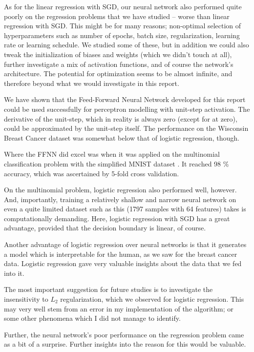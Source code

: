 \documentclass[]{article}
\begin{document}
As for the linear regression with SGD, our neural network also performed quite poorly on the regression problems that we have studied -- worse than linear regression with SGD. This might be for many reasons; non-optimal selection of hyperparameters such as number of epochs, batch size, regularization, learning rate or learning schedule. We studied some of these, but in addition we could also tweak the initialization of biases and weights (which we didn't touch at all), further investigate a mix of activation functions, and of course the network's architecture. The potential for optimization seems to be almost infinite, and therefore beyond what we would investigate in this report.

We have shown that the Feed-Forward Neural Network developed for this report could be used successfully for perceptron modelling with unit-step activation. The derivative of the unit-step, which in reality is always zero (except for at zero), could be approximated by the unit-step itself. The performance on the Wisconsin Breast Cancer dataset \cite{skl-datasets} was somewhat below that of logistic regression, though.

Where the FFNN did excel was when it was applied on the multinomial classification problem with the simplified MNIST dataset \cite{skl-datasets}. It reached 98 \% accuracy, which was ascertained by 5-fold cross validation.

On the multinomial problem, logistic regression also performed well, however. And, importantly, training a relatively shallow and narrow neural network on even a quite limited dataset such as this (1797 samples with 64 features) takes is computationally demanding. Here, logistic regression with SGD has a great advantage, provided that the decision boundary is linear, of course.

Another advantage of logistic regression over neural networks is that it generates a model which is interpretable for the human, as we saw for the breast cancer data. Logistic regression gave very valuable insights about the data that we fed into it.

\vspace{5mm}

The most important suggestion for future studies is to investigate the insensitivity to $L_2$ regularization, which we observed for logistic regression. This may very well stem from an error in my implementation of the algorithm; or some other phenomena which I did not manage to identify.

Further, the neural network's poor performance on the regression problem came as a bit of a surprise. Further insights into the reason for this would be valuable.

\clearpage


\end{document}
